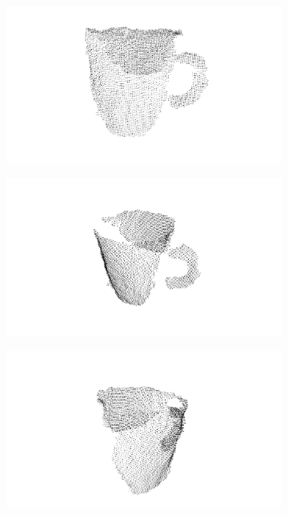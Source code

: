 \begin{figure}
	\begin{subfigure}[b]{0.24\textwidth}
		\includegraphics[width=\textwidth]{img/ejemplos_nubes/taza_01.png}
	\end{subfigure}
	\begin{subfigure}[b]{0.24\textwidth}
		\includegraphics[width=\textwidth]{img/ejemplos_nubes/taza_02.png}
	\end{subfigure}
	\begin{subfigure}[b]{0.24\textwidth}
		\includegraphics[width=\textwidth]{img/ejemplos_nubes/taza_03.png}

\end{subfigure}
\end{figure}
